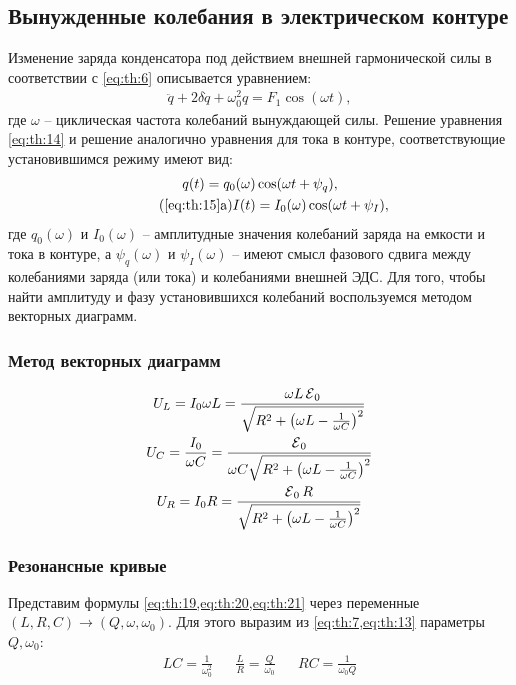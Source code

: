 \subsection{Вынужденные колебания в электрическом контуре}

Изменение заряда конденсатора под действием внешней гармонической силы в соответствии с \cref{eq:th:6} описывается уравнением:
\begin{align} \label{eq:th:14}
	\ddot{q} + 2 \delta \dot{q} + \omega_0^2 q = F_1 \cos (\omega t),
\end{align}
где $\omega$ -- циклическая частота колебаний вынуждающей силы. Решение уравнения \cref{eq:th:14} и решение аналогично уравнения для тока в контуре, соответствующие установившимся режиму имеют вид: 
\begin{gather}
	\label{eq:th:15} q(t) = q_0 (\omega) \cos (\omega t + \psi_q), \\
	\label{eq:th:15a} \tag{\ref{eq:th:15}a} I(t) = I_0(\omega) \cos (\omega t + \psi_I),
\end{gather}
где $q_0(\omega)$ и $I_0(\omega)$ -- амплитудные значения колебаний заряда на емкости и тока в контуре, а $\psi_q(\omega)$ и $\psi_I(\omega)$ -- имеют смысл фазового сдвига между колебаниями заряда (или тока) и колебаниями внешней ЭДС. Для того, чтобы найти амплитуду и фазу установившихся колебаний воспользуемся методом векторных диаграмм.

\subsubsection*{Метод векторных диаграмм}
\begin{gather}
	\label{eq:th:19} U_L = I_0 \omega L = \frac{\omega L \operatorname{\mathcal{E}}_0}{\sqrt{R^2 + \left(\omega L - \frac{1}{\omega C}\right)^2}}\\
	\label{eq:th:20} U_C = \frac{I_0}{\omega C} = \frac{\operatorname{\mathcal{E}}_0}{\omega C \sqrt{R^2 + \left(\omega L - \frac{1}{\omega C}\right)^2}}\\
	\label{eq:th:21} U_R = I_0 R = \frac{\operatorname{\mathcal{E}}_0 R}{\sqrt{R^2 + \left(\omega L - \frac{1}{\omega C}\right)^2}}
\end{gather}

\subsubsection{Резонансные кривые}

Представим формулы \cref{eq:th:19,eq:th:20,eq:th:21} через переменные $(L, R, C) \to (Q, \omega, \omega_0)
$. Для этого выразим из \cref{eq:th:7,eq:th:13} параметры $Q, \omega_0$:
\begin{align*}
	LC = \frac{1}{\omega^2_0} && \frac{L}{R} = \frac{Q}{\omega_0} && RC = \frac{1}{\omega_0 Q}
\end{align*}

